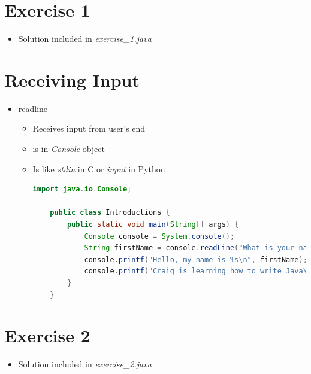 \documentclass[12pt]{article}
\begin{document}
\bigskip

\section{Exercise 1}

\bigskip

\begin{itemize}
    \item Solution included in \textit{exercise\_1.java}
\end{itemize}

\bigskip

\section{Receiving Input}

\bigskip

\begin{itemize}
    \item readline
    \begin{itemize}
        \item Receives input from user's end
        \item is in \textit{Console} object
        \item Is like \textit{stdin} in C or \textit{input} in Python

    \begin{lstlisting}[language=java]
    import java.io.Console;

    public class Introductions {
        public static void main(String[] args) {
            Console console = System.console();
            String firstName = console.readLine("What is your name?   "); // <- Here :)
            console.printf("Hello, my name is %s\n", firstName);
            console.printf("Craig is learning how to write Java\n");
        }
    }
    \end{lstlisting}
    \end{itemize}
\end{itemize}

\bigskip

\section{Exercise 2}

\bigskip

\begin{itemize}
    \item Solution included in \textit{exercise\_2.java}
\end{itemize}
\end{document}
